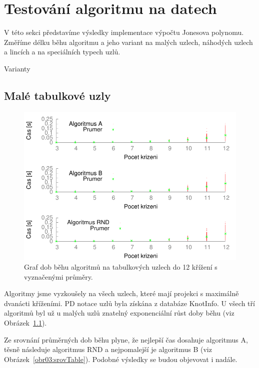 
\chapter{Testování algoritmu na datech}

V této sekci představíme výsledky implementace výpočtu Jonesova polynomu. Změříme délku běhu algoritmu a jeho variant na malých uzlech, náhodých uzlech a lincích a na speciálních typech uzlů.

Varianty

\section{Malé tabulkové uzly}

\begin{figure}[p]\centering
\includegraphics{../img/multiTable}
\caption{Graf dob běhu algoritmů na tabulkových uzlech do 12 křížení s vyznačenými průměry.}
\label{obr03:multiTable}
\end{figure}

Algoritmy jsme vyzkoušely na všech uzlech, které mají projekci s maximálně dvanácti kříženími. PD notace uzlů byla získána z databáze KnotInfo. 
U všech tří algoritmů byl už u malých uzlů znatelný exponenciální růst doby běhu (viz Obrázek~\ref{obr03:multiTable}).
 

Ze srovnání průměrných dob běhu plyne, že nejlepší čas dosahuje algoritmus A, těsně následuje algoritmus RND a nejpomalejší je algoritmus B (viz Obrázek~\ref{obr03:srovTable}). Podobné výsledky se budou objevovat i nadále.
	
